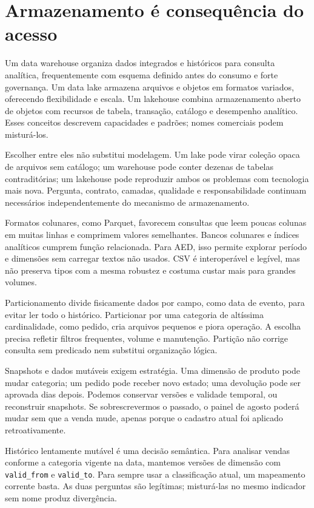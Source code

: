 \section{Armazenamento é consequência do acesso}

Um data warehouse organiza dados integrados e históricos para consulta analítica, frequentemente com esquema definido antes do consumo e forte governança. Um data lake armazena arquivos e objetos em formatos variados, oferecendo flexibilidade e escala. Um lakehouse combina armazenamento aberto de objetos com recursos de tabela, transação, catálogo e desempenho analítico. Esses conceitos descrevem capacidades e padrões; nomes comerciais podem misturá-los.

Escolher entre eles não substitui modelagem. Um lake pode virar coleção opaca de arquivos sem catálogo; um warehouse pode conter dezenas de tabelas contraditórias; um lakehouse pode reproduzir ambos os problemas com tecnologia mais nova. Pergunta, contrato, camadas, qualidade e responsabilidade continuam necessários independentemente do mecanismo de armazenamento.

Formatos colunares, como Parquet, favorecem consultas que leem poucas colunas em muitas linhas e comprimem valores semelhantes. Bancos colunares e índices analíticos cumprem função relacionada. Para AED, isso permite explorar período e dimensões sem carregar textos não usados. CSV é interoperável e legível, mas não preserva tipos com a mesma robustez e costuma custar mais para grandes volumes.

Particionamento divide fisicamente dados por campo, como data de evento, para evitar ler todo o histórico. Particionar por uma categoria de altíssima cardinalidade, como pedido, cria arquivos pequenos e piora operação. A escolha precisa refletir filtros frequentes, volume e manutenção. Partição não corrige consulta sem predicado nem substitui organização lógica.

Snapshots e dados mutáveis exigem estratégia. Uma dimensão de produto pode mudar categoria; um pedido pode receber novo estado; uma devolução pode ser aprovada dias depois. Podemos conservar versões e validade temporal, ou reconstruir snapshots. Se sobrescrevermos o passado, o painel de agosto poderá mudar sem que a venda mude, apenas porque o cadastro atual foi aplicado retroativamente.

Histórico lentamente mutável é uma decisão semântica. Para analisar vendas conforme a categoria vigente na data, mantemos versões de dimensão com \texttt{valid\_from} e \texttt{valid\_to}. Para sempre usar a classificação atual, um mapeamento corrente basta. As duas perguntas são legítimas; misturá-las no mesmo indicador sem nome produz divergência.

